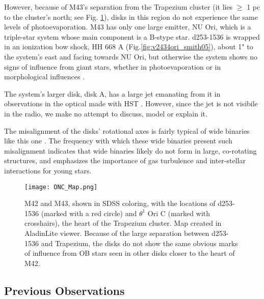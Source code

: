 However, because of M43's separation from the Trapezium cluster (it lies $\geq$ 1 pc to the cluster's north; see Fig. \ref{fig:onc_map}), disks in this region do not experience the same levels of photoevaporation. M43 has only one large emitter, NU Ori, which is a triple-star system whose main component is a B-stype star. d253-1536 is wrapped in an ionization bow shock, HH 668 A (Fig.\ref{fig:v2434ori_smith05}), about 1" to the system's east and facing towards NU Ori, but otherwise the system shows no signs of influence from giant stars, whether in photoevaporation or in morphological influences \citep{MannWilliams2009}.

The system's larger disk, disk A, has a large jet emanating from it in observations in the optical made with HST \citep{Smith2005}. However, since the jet is not visibile in the radio, we make no attempt to discuss, model or explain it.

The misalignment of the disks' rotational axes is fairly typical of wide binaries like this one \citep{Williams2014}. The frequency with which these wide binaries present such misalignment indicates that wide binaries likely do not form in large, co-rotating structures, and emphasizes the importance of gas turbulence and inter-stellar interactions for young stars.

\begin{figure}[t]
\centering
  \texttt{[image: ONC\_Map.png]}
  \caption{M42 and M43, shown in SDSS coloring, with the locations of d253-1536 (marked with a red circle) and $\theta^1$ Ori C (marked with crosshairs), the heart of the Trapezium cluster. Map created in AladinLite viewer. Because of the large separation between d253-1536 and Trapezium, the disks do not show the same obvious marks of influence from OB stars seen in other disks closer to the heart of M42.}
  \label{fig:onc_map}
\end{figure}
%




\subsection{Previous Observations}

